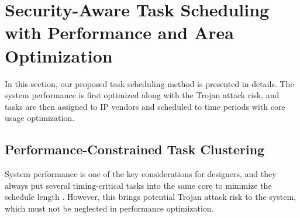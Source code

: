 \documentclass[10pt,journal]{IEEEtran}
\begin{document}






\section{Security-Aware Task Scheduling with Performance and Area Optimization}

In this section, our proposed task scheduling method is presented in details. The system performance is first optimized along with the Trojan attack risk, and tasks are then assigned to IP vendors and scheduled to time periods with core usage optimization.%

\subsection{Performance-Constrained Task Clustering}
System performance is one of the key considerations for designers, and they always put several timing-critical tasks into the same core to minimize the schedule length \cite{article:CL} \cite{article:NW}. However, this brings potential Trojan attack risk to the system, which must not be neglected in performance optimization.%
\end{document}
